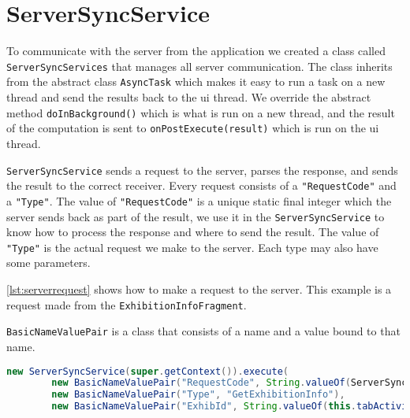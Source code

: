 \section{ServerSyncService}

To communicate with the server from the application we created a class called \lstinline|ServerSyncServices| that manages all server communication. The class inherits from the abstract class \lstinline|AsyncTask| which makes it easy to run a task on a new thread and send the results back to the \ac{ui} thread. We override the abstract method \lstinline|doInBackground()| which is what is run on a new thread, and the result of the computation is sent to \lstinline|onPostExecute(result)| which is run on the \ac{ui} thread.

\lstinline|ServerSyncService| sends a request to the server, parses the response, and sends the result to the correct receiver. Every request consists of a \lstinline|"RequestCode"| and a \lstinline|"Type"|. The value of \lstinline|"RequestCode"| is a unique static final integer which the server sends back as part of the result, we use it in the \lstinline|ServerSyncService| to know how to process the response and where to send the result. The value of \lstinline|"Type"| is the actual request we make to the server. Each type may also have some parameters.

\autoref{lst:serverrequest} shows how to make a request to the server. This example is a request made from the \lstinline|ExhibitionInfoFragment|.

\lstinline|BasicNameValuePair| is a class that consists of a name and a value bound to that name. %

\begin{lstlisting}[language=java, label=lst:serverrequest, caption={Get exhibition information request}]
new ServerSyncService(super.getContext()).execute(
        new BasicNameValuePair("RequestCode", String.valueOf(ServerSyncService.GET_EXHIBITION_INFO)),
        new BasicNameValuePair("Type", "GetExhibitionInfo"),
        new BasicNameValuePair("ExhibId", String.valueOf(this.tabActivity.getExhibId());
\end{lstlisting}

